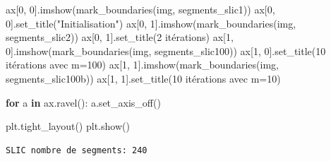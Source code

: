 \documentclass[
  11pt,
  letterpaper,
  open=any,
  twoside=false,
  french]{scrbook}
\newenvironment{Shaded}{\begin{snugshade}}{\end{snugshade}}
\newcommand{\ControlFlowTok}[1]{\textcolor[rgb]{0.00,0.23,0.31}{\textbf{#1}}}
\newcommand{\DecValTok}[1]{\textcolor[rgb]{0.68,0.00,0.00}{#1}}
\newcommand{\KeywordTok}[1]{\textcolor[rgb]{0.00,0.23,0.31}{\textbf{#1}}}
\newcommand{\NormalTok}[1]{\textcolor[rgb]{0.00,0.23,0.31}{#1}}
\newcommand{\StringTok}[1]{\textcolor[rgb]{0.13,0.47,0.30}{#1}}
\begin{document}
\begin{Shaded}
\begin{Highlighting}[]
\NormalTok{ax[}\DecValTok{0}\NormalTok{, }\DecValTok{0}\NormalTok{].imshow(mark\_boundaries(img, segments\_slic1))}
\NormalTok{ax[}\DecValTok{0}\NormalTok{, }\DecValTok{0}\NormalTok{].set\_title(}\StringTok{"Initialisation"}\NormalTok{)}
\NormalTok{ax[}\DecValTok{0}\NormalTok{, }\DecValTok{1}\NormalTok{].imshow(mark\_boundaries(img, segments\_slic2))}
\NormalTok{ax[}\DecValTok{0}\NormalTok{, }\DecValTok{1}\NormalTok{].set\_title(}\StringTok{\textquotesingle{}2 itérations\textquotesingle{}}\NormalTok{)}
\NormalTok{ax[}\DecValTok{1}\NormalTok{, }\DecValTok{0}\NormalTok{].imshow(mark\_boundaries(img, segments\_slic100))}
\NormalTok{ax[}\DecValTok{1}\NormalTok{, }\DecValTok{0}\NormalTok{].set\_title(}\StringTok{\textquotesingle{}10 itérations avec m=100\textquotesingle{}}\NormalTok{)}
\NormalTok{ax[}\DecValTok{1}\NormalTok{, }\DecValTok{1}\NormalTok{].imshow(mark\_boundaries(img, segments\_slic100b))}
\NormalTok{ax[}\DecValTok{1}\NormalTok{, }\DecValTok{1}\NormalTok{].set\_title(}\StringTok{\textquotesingle{}10 itérations avec m=10\textquotesingle{}}\NormalTok{)}

\ControlFlowTok{for}\NormalTok{ a }\KeywordTok{in}\NormalTok{ ax.ravel():}
\NormalTok{    a.set\_axis\_off()}

\NormalTok{plt.tight\_layout()}
\NormalTok{plt.show()}
\end{Highlighting}
\end{Shaded}

\begin{verbatim}
SLIC nombre de segments: 240
\end{verbatim}
\end{document}
